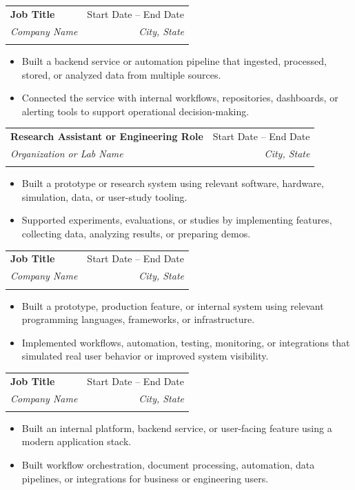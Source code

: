 \documentclass[letterpaper,11pt]{article}
\makeatletter
\newcommand{\resumeItem}[1]{
  \item\small{
    {#1 \vspace{-2pt}}
  }
}
\newcommand{\resumeSubheading}[5]{%
  \vspace{-2pt}\item
  \begin{tabularx}{\textwidth}{@{}X r@{}}
    \textbf{#1} & #2 \\
    \textit{#3} & \textit{#4}%
    \ifthenelse{\equal{#5}{}}{}{\\\small{\textit{#5}}}%
    \\[1pt]
  \end{tabularx}\vspace{-10pt}
}
\newcommand{\resumeItemListStart}{\begin{itemize}}
\newcommand{\resumeItemListEnd}{\end{itemize}\vspace{-5pt}}
\makeatother
\begin{document}
\vspace{4pt}
\resumeSubheading
  {Job Title}{Start Date -- End Date}
  {\vspace{4pt} Company Name \vspace{4pt}}{City, State}
  {}
\resumeItemListStart
\resumeItem{Built a backend service or automation pipeline that ingested, processed, stored, or analyzed data from multiple sources.}
\vspace{3pt}
\resumeItem{Connected the service with internal workflows, repositories, dashboards, or alerting tools to support operational decision-making.}
\resumeItemListEnd

\vspace{4pt}
\resumeSubheading
  {Research Assistant or Engineering Role}{Start Date -- End Date}
  {\vspace{4pt} Organization or Lab Name \vspace{4pt}}{City, State}
  {}
\resumeItemListStart
    \resumeItem{Built a prototype or research system using relevant software, hardware, simulation, data, or user-study tooling.}
\vspace{3pt}
    \resumeItem{Supported experiments, evaluations, or studies by implementing features, collecting data, analyzing results, or preparing demos.}
\resumeItemListEnd

\vspace{4pt}
\resumeSubheading
  {Job Title}{Start Date -- End Date}
  {\vspace{4pt} Company Name \vspace{4pt}}{City, State}
  {}
\resumeItemListStart
\resumeItem{Built a prototype, production feature, or internal system using relevant programming languages, frameworks, or infrastructure.}
\vspace{3pt}
\resumeItem{Implemented workflows, automation, testing, monitoring, or integrations that simulated real user behavior or improved system visibility.}
\resumeItemListEnd

\vspace{4pt}
\resumeSubheading
  {Job Title}{Start Date -- End Date}
  {\vspace{4pt} Company Name \vspace{4pt}}{City, State}
  {}
\resumeItemListStart
    \resumeItem{Built an internal platform, backend service, or user-facing feature using a modern application stack.}
\vspace{3pt}
    \resumeItem{Built workflow orchestration, document processing, automation, data pipelines, or integrations for business or engineering users.}
\resumeItemListEnd
\end{document}
